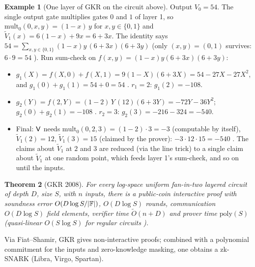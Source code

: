 \documentclass[11pt,a4paper]{report}
\theoremstyle{plain}
\newtheorem{theorem}{Theorem}[chapter]
\theoremstyle{definition}
\newtheorem{example}[theorem]{Example}
\theoremstyle{remark}
\newcommand{\poly}{\mathrm{poly}}
\begin{document}
\begin{example}[One layer of GKR on the circuit above]
Output $V_0=54$. The single output gate multiplies gates $0$ and $1$ of layer 1, so $\mathrm{mult}_0(0,x,y)=(1-x)\,y$ for $x,y\in\{0,1\}$ and $\tilde V_1(x)=6(1-x)+9x=6+3x$. The identity says $54=\sum_{x,y\in\{0,1\}}(1-x)y\,(6+3x)(6+3y)$ (only $(x,y)=(0,1)$ survives: $6\cdot9=54$ \checkmark). Run sum-check on $f(x,y)=(1-x)y(6+3x)(6+3y)$:
\begin{itemize}
\item $g_1(X)=f(X,0)+f(X,1)=9(1-X)(6+3X)=54-27X-27X^2$, and $g_1(0)+g_1(1)=54+0=54$ \checkmark. $r_1=2$: $g_1(2)=-108$.
\item $g_2(Y)=f(2,Y)=(1-2)\,Y\,(12)(6+3Y)=-72Y-36Y^2$; $g_2(0)+g_2(1)=-108$ \checkmark. $r_2=3$: $g_2(3)=-216-324=-540$.
\item Final: $\mathsf{V}$ needs $\mathrm{mult}_0(0,2,3)=(1-2)\cdot3=-3$ (computable by itself), $\tilde V_1(2)=12$, $\tilde V_1(3)=15$ (claimed by the prover): $-3\cdot12\cdot15=-540$ \checkmark. The claims about $\tilde V_1$ at $2$ and $3$ are reduced (via the line trick) to a single claim about $\tilde V_1$ at one random point, which feeds layer 1's sum-check, and so on until the inputs.
\end{itemize}
\end{example}
\begin{theorem}[GKR 2008]
For every log-space uniform fan-in-two layered circuit of depth $D$, size $S$, with $n$ inputs, there is a public-coin interactive proof with soundness error $O(D\log S/|\mathbb{F}|)$, $O(D\log S)$ rounds, communication $O(D\log S)$ field elements, verifier time $\tilde O(n+D)$ and prover time $\poly(S)$ (quasi-linear $O(S\log S)$ for regular circuits \cite{Tha13}).
\end{theorem}
Via Fiat--Shamir, GKR gives non-interactive proofs; combined with a polynomial commitment for the inputs and zero-knowledge masking, one obtains a zk-SNARK (Libra, Virgo, Spartan).
\end{document}
